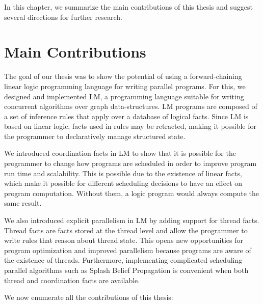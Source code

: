 
In this chapter, we summarize the main contributions of this thesis and suggest
several directions for further research.

\section{Main Contributions}

The goal of our thesis was to show the potential of using a forward-chaining
linear logic programming language for writing parallel programs. For this, we
designed and implemented LM, a programming language suitable for writing
concurrent algorithms over graph data-structures. LM programs are composed of a
set of inference rules that apply over a database of logical facts. Since LM is
based on linear logic, facts used in rules may be retracted, making it possible
for the programmer to declaratively manage structured state.

We introduced coordination facts in LM to show that it is possible for the
programmer to change how programs are scheduled in order to improve program run
time and scalability. This is possible due to the existence of linear facts,
which make it possible for different scheduling decisions to have an effect on
program computation. Without them, a logic program would always compute the same
result.

We also introduced explicit parallelism in LM by adding support for thread
facts. Thread facts are facts stored at the thread level and allow the
programmer to write rules that reason about thread state. This opens new
opportunities for program optimization and improved parallelism because programs
are aware of the existence of threads. Furthermore, implementing complicated
scheduling parallel algorithms such as Splash Belief Propagation is convenient
when both thread and coordination facts are available.

We now enumerate all the contributions of this thesis:

